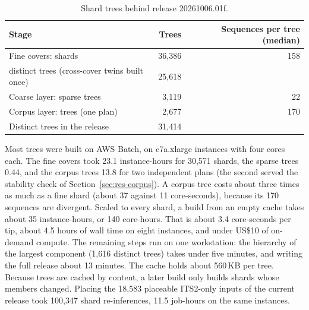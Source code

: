\documentclass[11pt,a4paper]{article}
\begin{document}
\begin{table}[t]
\centering\small
\caption{Shard trees behind release 20261006.01f.}
\label{tab:compute}
\begin{tabular}{@{}lrr@{}}
\toprule
Stage & Trees & Sequences per tree (median) \\
\midrule
Fine covers: shards & 36,386 & 158 \\
\quad distinct trees (cross-cover twins built once) & 25,618 & \\
Coarse layer: sparse trees & 3,119 & 22 \\
Corpus layer: trees (one plan) & 2,677 & 170 \\
\midrule
Distinct trees in the release & 31,414 & \\
\bottomrule
\end{tabular}
\end{table}

Most trees were built on AWS Batch, on c7a.xlarge instances with four cores each. The fine covers
took 23.1 instance-hours for 30,571 shards, the sparse trees 0.44, and the corpus trees 13.8 for two
independent plans (the second served the stability check of Section~\ref{sec:res-corpus}). A corpus
tree costs about three times as much as a fine shard (about 37 against 11 core-seconds), because its
170 sequences are divergent. Scaled to every shard, a build from an empty cache takes about 35
instance-hours, or 140 core-hours. That is about 3.4 core-seconds per tip, about 4.5 hours of wall
time on eight instances, and under US\$10 of on-demand compute. The remaining steps run on one
workstation: the hierarchy of the largest component (1{,}616 distinct trees) takes under five
minutes, and writing the full release about 13 minutes. The cache holds about 560\,KB per tree.
Because trees are cached by content, a later build only builds shards whose members changed.
Placing the 18,583 placeable ITS2-only inputs of the current release took 100,347 shard
re-inferences, 11.5 job-hours on the same instances.
\end{document}
